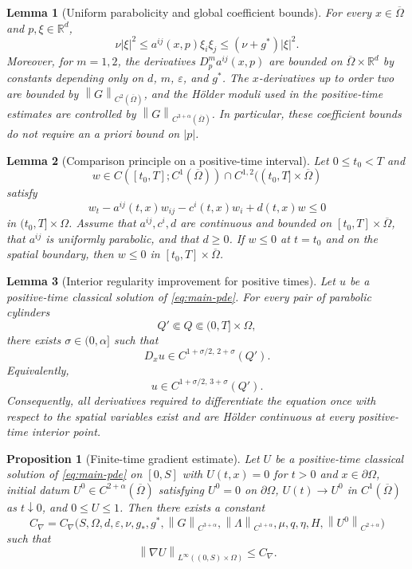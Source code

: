 \documentclass[10pt,a4paper]{amsart}
\newtheorem{lemma}{Lemma}
\newtheorem{proposition}{Proposition}
\newcommand{\R}{\mathbb{R}}
\newcommand{\eps}{\varepsilon}
\newcommand{\norm}[1]{\left\lVert #1\right\rVert}
\newcommand{\nupar}{\nu}
\begin{document}
\begin{lemma}[Uniform parabolicity and global coefficient bounds]\label{lem:ellipticity}
For every $x\in\overline\Omega$ and $p,\xi\in\R^d$,
\begin{equation}\label{eq:ellipticity}
        \nupar |\xi|^2\le a^{ij}(x,p)\xi_i\xi_j\le (\nupar+g^*)|\xi|^2.
\end{equation}
Moreover, for $m=1,2$, the derivatives $D_p^m a^{ij}(x,p)$ are bounded on $\overline\Omega\times\R^d$ by constants depending only on $d$, $m$, $\eps$, and $g^*$.  The $x$-derivatives up to order two are bounded by $\norm{G}_{C^{2}(\overline\Omega)}$, and the H\"older moduli used in the positive-time estimates are controlled by $\norm{G}_{C^{3+\alpha}(\overline\Omega)}$.  In particular, these coefficient bounds do not require an a priori bound on $|p|$.
\end{lemma}

\begin{lemma}[Comparison principle on a positive-time interval]\label{lem:comparison}
Let $0\le t_0<T$ and
\[
 w\in C([t_0,T];C^1(\overline\Omega))\cap C^{1,2}((t_0,T]\times\overline\Omega)
\]
satisfy
\[
 w_t-a^{ij}(t,x)w_{ij}-c^i(t,x)w_i+d(t,x)w\le0
\]
in $(t_0,T]\times\Omega$.  Assume that $a^{ij},c^i,d$ are continuous and bounded on $[t_0,T]\times\overline\Omega$, that $a^{ij}$ is uniformly parabolic, and that $d\ge0$.  If $w\le0$ at $t=t_0$ and on the spatial boundary, then $w\le0$ in $[t_0,T]\times\overline\Omega$.
\end{lemma}

\begin{lemma}[Interior regularity improvement for positive times]
\label{lem:interior-bootstrap}
Let $u$ be a positive-time classical solution of
\eqref{eq:main-pde}. For every pair of parabolic cylinders
\[
Q'\Subset Q\Subset (0,T]\times\Omega,
\]
there exists $\sigma\in(0,\alpha]$ such that
\[
D_xu\in C^{1+\sigma/2,\,2+\sigma}(Q').
\]
Equivalently,
\[
u\in C^{1+\sigma/2,\,3+\sigma}(Q').
\]
Consequently, all derivatives required to differentiate the equation once
with respect to the spatial variables exist and are H\"older continuous at
every positive-time interior point.
\end{lemma}

\begin{proposition}[Finite-time gradient estimate]\label{prop:finite-gradient}
Let $U$ be a positive-time classical solution of \eqref{eq:main-pde} on $[0,S]$ with $U(t,x)=0$ for $t>0$ and $x\in\partial\Omega$, initial datum $U^0\in C^{2+\alpha}(\overline\Omega)$ satisfying $U^0=0$ on $\partial\Omega$, $U(t)\to U^0$ in $C^1(\overline\Omega)$ as $t\downarrow0$, and $0\le U\le1$.  Then there exists a constant
\[
        C_{\nabla}=C_{\nabla}\bigl(S,\Omega,d,\eps,\nupar,g_*,g^*,
        \norm{G}_{C^{3+\alpha}},\norm{\Lambda}_{C^{1+\alpha}},
        \mu,q,\eta,H,\norm{U^0}_{C^{2+\alpha}}\bigr)
\]
such that
\[
        \norm{\nabla U}_{L^\infty((0,S)\times\Omega)}\le C_{\nabla}.
\]
\end{proposition}
\end{document}
